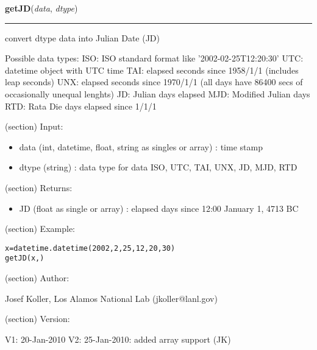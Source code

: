     \label{spacepy:ticktock:getJD}

    \vspace{0.5ex}

\hspace{.8\funcindent}\begin{boxedminipage}{\funcwidth}

    \raggedright \textbf{getJD}(\textit{data}, \textit{dtype})

    \vspace{-1.5ex}

    \rule{\textwidth}{0.5\fboxrule}
\setlength{\parskip}{2ex}
    convert dtype data into Julian Date (JD)

    Possible data types: ISO: ISO standard format like 
    '2002-02-25T12:20:30' UTC: datetime object with UTC time TAI: elapsed 
    seconds since 1958/1/1 (includes leap seconds) UNX: elapsed seconds 
    since 1970/1/1 (all days have 86400 secs of occasionally unequal 
    lenghts) JD: Julian days elapsed MJD: Modified Julian days RTD: Rata 
    Die days elapsed since 1/1/1

    (section) Input:

      \begin{itemize}
      \setlength{\parskip}{0.6ex}
        \item data (int, datetime, float, string as singles or array) : time 
          stamp

        \item dtype (string) : data type for data ISO, UTC, TAI, UNX, JD, MJD, 
          RTD

      \end{itemize}

    (section) Returns:

      \begin{itemize}
      \setlength{\parskip}{0.6ex}
        \item JD (float as single or array) : elapsed days since 12:00 January 
          1, 4713 BC

      \end{itemize}

    (section) Example:

\begin{alltt}
\pysrcprompt{{\textgreater}{\textgreater}{\textgreater} }x=datetime.datetime(2002,2,25,12,20,30)
\pysrcprompt{{\textgreater}{\textgreater}{\textgreater} }getJD(x, )
\end{alltt}
    (section) Author:

      Josef Koller, Los Alamos National Lab (jkoller@lanl.gov)

    (section) Version:

      V1: 20-Jan-2010 V2: 25-Jan-2010: added array support (JK)

\setlength{\parskip}{1ex}
    \end{boxedminipage}

